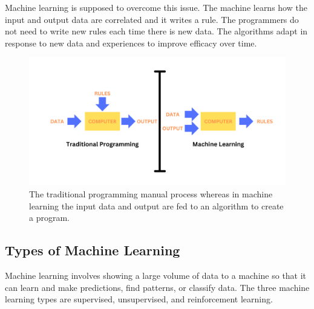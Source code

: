 \documentclass{article}
\begin{document}
Machine learning is supposed to overcome this issue. The machine learns how the input and output data are correlated and it writes a rule. The programmers do not need to write new rules each time there is new data. The algorithms adapt in response to new data and experiences to improve efficacy over time.

\begin{figure}[h]
\centering
\includegraphics[width=1\textwidth]{image2.png}
\caption{The traditional programming manual process whereas in machine learning the input data and output are fed to an algorithm to create a program.}
\label{fig: the traditional programming vs machine learning.}
\end{figure}

\subsection{Types of Machine Learning}
Machine learning involves showing a large volume of data to a machine so that it can learn and make predictions, find patterns, or classify data. The three machine learning types are supervised, unsupervised, and reinforcement learning.
\end{document}

